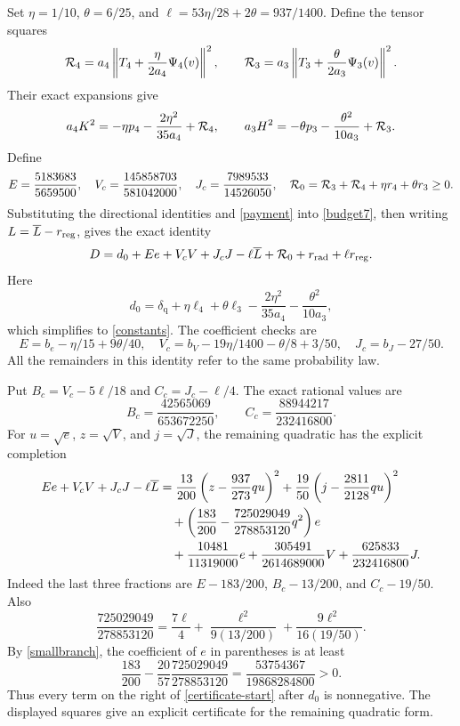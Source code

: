 \documentclass[11pt]{article}
\theoremstyle{remark}\newtheorem{remark}[theorem]{Remark}
\numberwithin{equation}{section}
\begin{document}
Set $\eta=1/10$, $\theta=6/25$, and
$\ell=53\eta/28+2\theta=937/1400$. Define the tensor squares
\[
 {\cal R}_4=a_4\left\|T_4+\frac{\eta}{2a_4}\Psi_4(v)\right\|^2,\qquad
 {\cal R}_3=a_3\left\|T_3+\frac{\theta}{2a_3}\Psi_3(v)\right\|^2.
\]
Their exact expansions give
\[
 a_4K^2=-\eta p_4-\frac{2\eta^2}{35a_4}+{\cal R}_4,\qquad
 a_3H^2=-\theta p_3-\frac{\theta^2}{10a_3}+{\cal R}_3.
\]
Define
\[
 E=\frac{5183683}{5659500},\quad
 V_c=\frac{145858703}{581042000},\quad
 J_c=\frac{7989533}{14526050},\quad
 {\cal R}_0={\cal R}_3+{\cal R}_4+\eta r_4+\theta r_3\ge0.
\]
Substituting the directional identities and \eqref{payment} into
\eqref{budget7}, then writing $L=\overline L-r_{\rm reg}$, gives the exact identity
\begin{equation}\label{certificate-start}
 D=d_0+E e+V_c V+J_c J-\ell\overline L
             +{\cal R}_0+r_{\rm rad}+\ell r_{\rm reg}.
\end{equation}
Here
\[
 d_0=\delta_{\mathrm q}+\eta\ell_4+\theta\ell_3
                 -\frac{2\eta^2}{35a_4}-\frac{\theta^2}{10a_3},
\]
which simplifies to \eqref{constants}. The coefficient checks are
\[
 E=b_e-\eta/15+9\theta/40,\quad
 V_c=b_V-19\eta/1400-\theta/8+3/50,\quad J_c=b_J-27/50.
\]
All the remainders in this identity refer to the same probability law.

Put $B_c=V_c-5\ell/18$ and $C_c=J_c-\ell/4$. The exact rational values are
\[
 B_c=\frac{42565069}{653672250},\qquad
 C_c=\frac{88944217}{232416800}.
\]
For $u=\sqrt e$, $z=\sqrt V$, and $j=\sqrt J$, the remaining quadratic has
the explicit completion
\begin{align}\label{squares}
 E e+V_c V+J_c J-\ell\overline L
 &=\frac{13}{200}\left(z-\frac{937}{273}qu\right)^2
   +\frac{19}{50}\left(j-\frac{2811}{2128}qu\right)^2\notag\\
 &\quad+\left(\frac{183}{200}-\frac{725029049}{278853120}q^2\right)e\notag\\
 &\quad+\frac{10481}{11319000}e
        +\frac{305491}{2614689000}V+\frac{625833}{232416800}J.
\end{align}
Indeed the last three fractions are $E-183/200$, $B_c-13/200$,
and $C_c-19/50$. Also
\[
 \frac{725029049}{278853120}
  =\frac{7\ell}{4}+\frac{\ell^2}{9(13/200)}
                          +\frac{9\ell^2}{16(19/50)}.
\]
By \eqref{smallbranch}, the coefficient of $e$ in parentheses is at least
\[
 \frac{183}{200}-\frac{20}{57}\frac{725029049}{278853120}
                         =\frac{53754367}{19868284800}>0.
\]
Thus every term on the right of \eqref{certificate-start} after $d_0$
is nonnegative. The displayed squares give an explicit certificate for the remaining
quadratic form.
\end{document}
